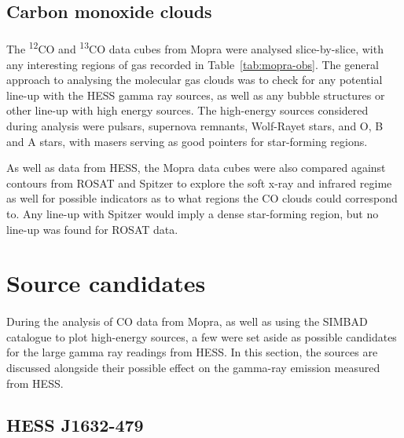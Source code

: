 \documentclass[a4paper, titlepage, oneside]{article}
\newcommand{\elem}[2]{\textsuperscript{#1}{#2}}
\begin{document}
\begin{multicols}{2}
\subsection{Carbon monoxide clouds}
\paragraph{}
The \elem{12}{C}O and \elem{13}{C}O data cubes from Mopra were analysed slice-by-slice, with any interesting regions of gas recorded in Table~\ref{tab:mopra-obs}. The general approach to analysing the molecular gas clouds was to check for any potential line-up with the HESS gamma ray sources, as well as any bubble structures or other line-up with high energy sources. The high-energy sources considered during analysis were pulsars, supernova remnants, Wolf-Rayet stars, and O, B and A stars, with masers serving as good pointers for star-forming regions.

As well as data from HESS, the Mopra data cubes were also compared against contours from ROSAT and Spitzer to explore the soft x-ray and infrared regime as well for possible indicators as to what regions the CO clouds could correspond to. Any line-up with Spitzer would imply a dense star-forming region, but no line-up was found for ROSAT data.

\section{Source candidates}
\paragraph{}
During the analysis of CO data from Mopra, as well as using the SIMBAD catalogue to plot high-energy sources, a few were set aside as possible candidates for the large gamma ray readings from HESS. In this section, the sources are discussed alongside their possible effect on the gamma-ray emission measured from HESS.

\subsection{HESS J1632-479}


\end{multicols}
\end{document}
